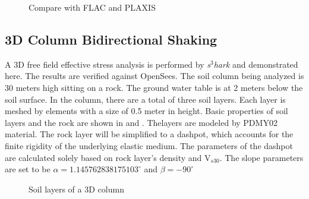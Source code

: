 \begin{figure}[!htbp]
  \caption{Compare with FLAC and PLAXIS }
  \label{fig:s3hark7}
\end{figure}


\subsection{3D Column Bidirectional Shaking}

A 3D free field effective stress analysis is performed by \textit{s$^3$hark}
and demonstrated here.  The results are verified against OpenSees.  
The soil column being analyzed is 30 meters high sitting on a
rock.  The ground water table is at 2 meters below the soil surface.
In the column, there are a total of three soil layers. Each layer is
meshed by elements with a size of 0.5 meter in height.  Basic
properties of soil layers and the rock are shown
in  and .  
Thelayers are modeled by PDMY02 material.  
The rock layer will be simplified to a \cite{Lysmer:1969} dashpot,
which accounts for the finite rigidity of the underlying elastic
medium.  The parameters of the dashpot are calculated solely based on
rock layer's density and V$_{s30}$. 
The slope parameters are set to be $\alpha=1.145762838175103^{\circ}$ and $\beta=-90^{\circ}$



\begin{figure}[!htbp]
  \caption{Soil layers of a 3D column}
  \label{fig:s3harkSoilColumn3D}
\end{figure}


